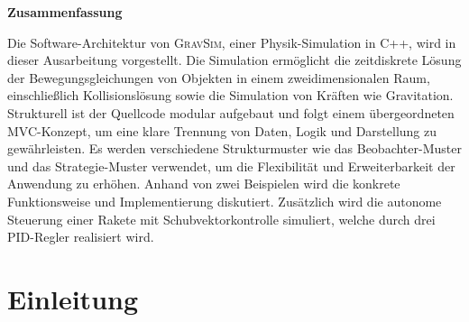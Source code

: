 \documentclass[10pt,twocolumn]{extarticle}
\begin{document}


\textbf{Zusammenfassung}

Die Software-Architektur von \textsc{GravSim}, einer Physik-Simulation in C++, wird in dieser Ausarbeitung vorgestellt. Die Simulation ermöglicht die zeitdiskrete Lösung der Bewegungsgleichungen von Objekten in einem zweidimensionalen Raum, einschließlich Kollisionslösung sowie die Simulation von Kräften wie Gravitation. Strukturell ist der Quellcode modular aufgebaut und folgt einem übergeordneten MVC-Konzept, um eine klare Trennung von Daten, Logik und Darstellung zu gewährleisten. Es werden verschiedene Strukturmuster wie das Beobachter-Muster und das Strategie-Muster verwendet, um die Flexibilität und Erweiterbarkeit der Anwendung zu erhöhen. Anhand von zwei Beispielen wird die konkrete Funktionsweise und Implementierung diskutiert. Zusätzlich wird die autonome Steuerung einer Rakete mit Schubvektorkontrolle simuliert, welche durch drei PID-Regler realisiert wird.



\section{Einleitung}
\end{document}
